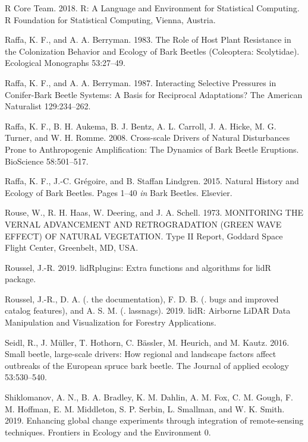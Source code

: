 \documentclass[]{article}
\begin{document}
\hypertarget{ref-rcoreteam2018}{}
R Core Team. 2018. R: A Language and Environment for Statistical
Computing. R Foundation for Statistical Computing, Vienna, Austria.

\hypertarget{ref-raffa1983}{}
Raffa, K. F., and A. A. Berryman. 1983. The Role of Host Plant
Resistance in the Colonization Behavior and Ecology of Bark Beetles
(Coleoptera: Scolytidae). Ecological Monographs 53:27--49.

\hypertarget{ref-raffa1987}{}
Raffa, K. F., and A. A. Berryman. 1987. Interacting Selective Pressures
in Conifer-Bark Beetle Systems: A Basis for Reciprocal Adaptations? The
American Naturalist 129:234--262.

\hypertarget{ref-raffa2008}{}
Raffa, K. F., B. H. Aukema, B. J. Bentz, A. L. Carroll, J. A. Hicke, M.
G. Turner, and W. H. Romme. 2008. Cross-scale Drivers of Natural
Disturbances Prone to Anthropogenic Amplification: The Dynamics of Bark
Beetle Eruptions. BioScience 58:501--517.

\hypertarget{ref-raffa2015}{}
Raffa, K. F., J.-C. Grégoire, and B. Staffan Lindgren. 2015. Natural
History and Ecology of Bark Beetles. Pages 1--40 \emph{in} Bark Beetles.
Elsevier.

\hypertarget{ref-rouse1973}{}
Rouse, W., R. H. Haas, W. Deering, and J. A. Schell. 1973. MONITORING
THE VERNAL ADVANCEMENT AND RETROGRADATION (GREEN WAVE EFFECT) OF NATURAL
VEGETATION. Type II Report, Goddard Space Flight Center, Greenbelt, MD,
USA.

\hypertarget{ref-roussel2019a}{}
Roussel, J.-R. 2019. lidRplugins: Extra functions and algorithms for
lidR package.

\hypertarget{ref-roussel2019}{}
Roussel, J.-R., D. A. (. the documentation), F. D. B. (. bugs and
improved catalog features), and A. S. M. (. lassnags). 2019. lidR:
Airborne LiDAR Data Manipulation and Visualization for Forestry
Applications.

\hypertarget{ref-seidl2016a}{}
Seidl, R., J. Müller, T. Hothorn, C. Bässler, M. Heurich, and M. Kautz.
2016. Small beetle, large-scale drivers: How regional and landscape
factors affect outbreaks of the European spruce bark beetle. The Journal
of applied ecology 53:530--540.

\hypertarget{ref-shiklomanov2019}{}
Shiklomanov, A. N., B. A. Bradley, K. M. Dahlin, A. M. Fox, C. M. Gough,
F. M. Hoffman, E. M. Middleton, S. P. Serbin, L. Smallman, and W. K.
Smith. 2019. Enhancing global change experiments through integration of
remote-sensing techniques. Frontiers in Ecology and the Environment 0.
\end{document}
